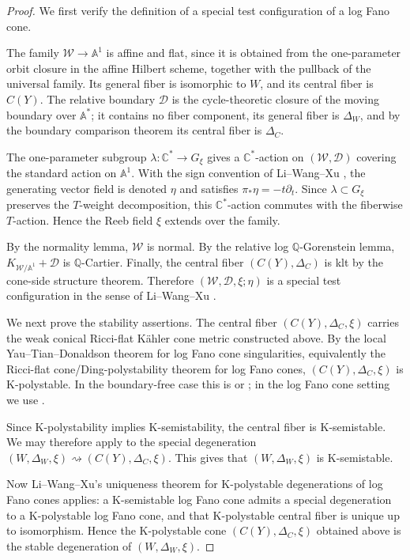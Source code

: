 \documentclass[11pt]{amsart}
\theoremstyle{definition}
\theoremstyle{remark}
\begin{document}
\begin{proof}
We first verify the definition of a special test configuration of a log Fano
cone.

The family $\mathcal W\to\mathbb A^1$ is affine and flat, since it is obtained
from the one-parameter orbit closure in the affine Hilbert scheme, together with
the pullback of the universal family. Its general fiber is isomorphic to $W$,
and its central fiber is $C(Y)$. The relative boundary $\mathcal D$ is the
cycle-theoretic closure of the moving boundary over $\mathbb A^*$; it contains
no fiber component, its general fiber is $\Delta_W$, and by the boundary
comparison theorem its central fiber is $\Delta_C$.

The one-parameter subgroup $\lambda:\mathbb C^*\to G_\xi$ gives a
$\mathbb C^*$-action on $(\mathcal W,\mathcal D)$ covering the standard action
on $\mathbb A^1$. With the sign convention of Li--Wang--Xu
\cite[Definition~2.23]{LiWangXu}, the generating
vector field is denoted $\eta$ and satisfies $\pi_*\eta=-t\partial_t$. Since
$\lambda\subset G_\xi$ preserves the $T$-weight decomposition, this
$\mathbb C^*$-action commutes with the fiberwise $T$-action. Hence the Reeb
field $\xi$ extends over the family.

By the normality lemma, $\mathcal W$ is normal. By the relative log
$\mathbb Q$-Gorenstein lemma, $K_{\mathcal W/\mathbb A^1}+\mathcal D$ is
$\mathbb Q$-Cartier. Finally, the central fiber $(C(Y),\Delta_C)$ is klt by the
cone-side structure theorem. Therefore $(\mathcal W,\mathcal D,\xi;\eta)$ is a special test configuration
in the sense of Li--Wang--Xu \cite[Definition~2.23]{LiWangXu}.

We next prove the stability assertions. The central fiber
$(C(Y),\Delta_C,\xi)$ carries the weak conical Ricci-flat K\"ahler cone metric
constructed above. By the local Yau--Tian--Donaldson theorem for log Fano cone
singularities, equivalently the Ricci-flat cone/Ding-polystability theorem for
log Fano cones, $(C(Y),\Delta_C,\xi)$ is K-polystable. In the boundary-free case
this is \cite[Theorem~1.1]{CollinsSzekelyhidi} or
\cite[Corollary~A.4]{LiWangXu}; in the log Fano cone setting we use
\cite[Theorem~2.9]{ChiLiWeightedSolitons}.

Since K-polystability implies K-semistability, the central fiber is
K-semistable. We may therefore apply \cite[Proposition~5.5]{LLXGuidedTour} to
the special degeneration
$(W,\Delta_W,\xi)\rightsquigarrow(C(Y),\Delta_C,\xi)$. This gives that
$(W,\Delta_W,\xi)$ is K-semistable.

Now Li--Wang--Xu's uniqueness theorem for K-polystable degenerations of log
Fano cones applies: a K-semistable log Fano cone admits a special degeneration
to a K-polystable log Fano cone, and that K-polystable central fiber is unique
up to isomorphism. Hence the K-polystable cone
$(C(Y),\Delta_C,\xi)$ obtained above is the stable degeneration of
$(W,\Delta_W,\xi)$.
\end{proof}
\end{document}
